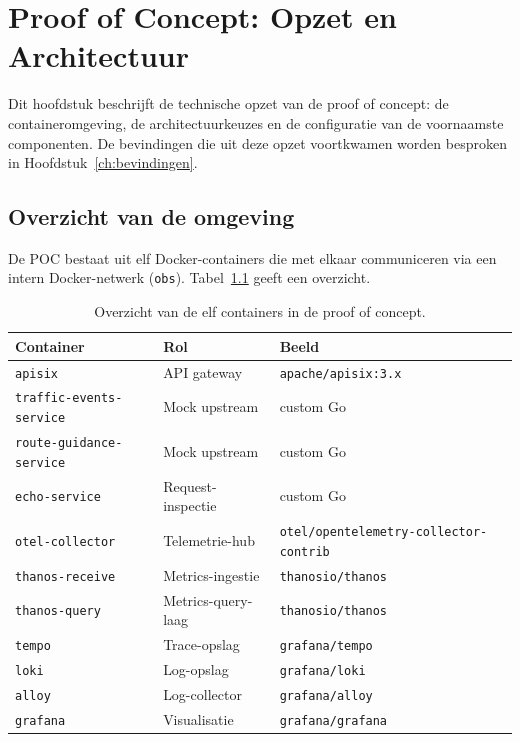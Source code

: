 
\chapter{Proof of Concept: Opzet en Architectuur}%
\label{ch:poc}

Dit hoofdstuk beschrijft de technische opzet van de proof of concept: de containeromgeving, de architectuurkeuzes en de configuratie van de voornaamste componenten. De bevindingen die uit deze opzet voortkwamen worden besproken in Hoofdstuk~\ref{ch:bevindingen}.

\section{Overzicht van de omgeving}%
\label{sec:poc-overzicht}

De POC bestaat uit elf Docker-containers die met elkaar communiceren via een intern Docker-netwerk (\texttt{obs}). Tabel~\ref{tab:containers} geeft een overzicht.

\begin{table}[h]
  \centering
  \begin{tabular}{lll}
    \toprule
    \textbf{Container} & \textbf{Rol} & \textbf{Beeld} \\
    \midrule
    \texttt{apisix} & API gateway & \texttt{apache/apisix:3.x} \\
    \texttt{traffic-events-service} & Mock upstream & custom Go \\
    \texttt{route-guidance-service} & Mock upstream & custom Go \\
    \texttt{echo-service} & Request-inspectie & custom Go \\
    \texttt{otel-collector} & Telemetrie-hub & \texttt{otel/opentelemetry-collector-contrib} \\
    \texttt{thanos-receive} & Metrics-ingestie & \texttt{thanosio/thanos} \\
    \texttt{thanos-query} & Metrics-query-laag & \texttt{thanosio/thanos} \\
    \texttt{tempo} & Trace-opslag & \texttt{grafana/tempo} \\
    \texttt{loki} & Log-opslag & \texttt{grafana/loki} \\
    \texttt{alloy} & Log-collector & \texttt{grafana/alloy} \\
    \texttt{grafana} & Visualisatie & \texttt{grafana/grafana} \\
    \bottomrule
  \end{tabular}
  \caption[Overzicht van de elf containers in de POC.]{\label{tab:containers}Overzicht van de elf containers in de proof of concept.}
\end{table}

